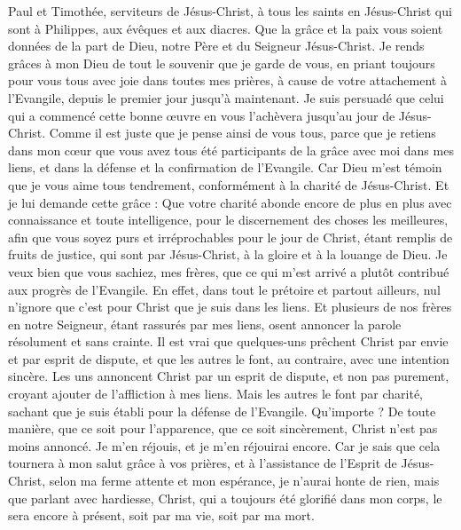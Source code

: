 \begin{multicols}{2}
\TextTitle{[Introduction]}
\VerseOne{}Paul et Timothée, serviteurs de Jésus-Christ, à tous les saints en Jésus-Christ qui sont à Philippes, aux évêques et aux diacres.
Que la grâce et la paix vous soient données de la part de Dieu, notre Père et du Seigneur Jésus-Christ.
Je rends grâces à mon Dieu de tout le souvenir que je garde de vous,
en priant toujours pour vous tous avec joie dans toutes mes prières,
à cause de votre attachement à l'Evangile, depuis le premier jour jusqu'à maintenant.
Je suis persuadé que celui qui a commencé cette bonne œuvre en vous l'achèvera jusqu'au jour de Jésus-Christ.
Comme il est juste que je pense ainsi de vous tous, parce que je retiens dans mon cœur que vous avez tous été participants de la grâce avec moi dans mes liens, et dans la défense et la confirmation de l'Evangile.
Car Dieu m'est témoin que je vous aime tous tendrement, conformément à la charité de Jésus-Christ.
Et je lui demande cette grâce : Que votre charité abonde encore de plus en plus avec connaissance et toute intelligence,
pour le discernement des choses les meilleures, afin que vous soyez purs et irréprochables pour le jour de Christ,
étant remplis de fruits de justice, qui sont par Jésus-Christ, à la gloire et à la louange de Dieu.
Je veux bien que vous sachiez, mes frères, que ce qui m’est arrivé a plutôt contribué aux progrès de l'Evangile.
En effet, dans tout le prétoire et partout ailleurs, nul n’ignore que c’est pour Christ que je suis dans les liens.
Et plusieurs de nos frères en notre Seigneur, étant rassurés par mes liens, osent annoncer la parole résolument et sans crainte.
Il est vrai que quelques-uns prêchent Christ par envie et par esprit de dispute, et que les autres le font, au contraire, avec une intention sincère.
Les uns annoncent Christ par un esprit de dispute, et non pas purement, croyant ajouter de l'affliction à mes liens.
Mais les autres le font par charité, sachant que je suis établi pour la défense de l'Evangile.
Qu’importe ? De toute manière, que ce soit pour l’apparence, que ce soit sincèrement, Christ n’est pas moins annoncé. Je m’en réjouis, et je m’en réjouirai encore.
Car je sais que cela tournera à mon salut grâce à vos prières, et à l’assistance de l'Esprit de Jésus-Christ,
selon ma ferme attente et mon espérance, je n’aurai honte de rien, mais que parlant avec hardiesse, Christ, qui a toujours été glorifié dans mon corps, le sera encore à présent, soit par ma vie, soit par ma mort.

\end{multicols}
